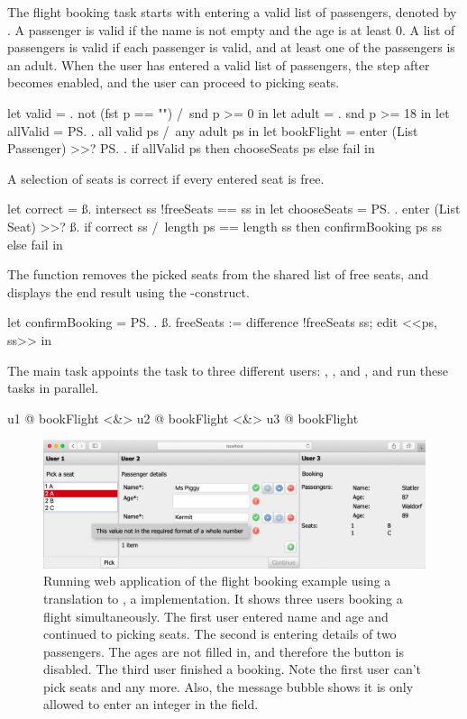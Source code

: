 The flight booking task starts with entering a valid list of passengers,
denoted by .
A passenger is valid if the name is not empty and the age is at least 0.
A list of passengers is valid if each passenger is valid, and at least one of the passengers is an adult.
When the user has entered a valid list of passengers, the step after  becomes enabled,
and the user can proceed to picking seats.
\begin{TASK}
  let valid = \p. not (fst p == "") /\ snd p >= 0 in
  let adult = \p. snd p >= 18 in
  let allValid = \ps. all valid ps /\ any adult ps in
  let bookFlight = enter (List Passenger) >>? \ps.
    if allValid ps then chooseSeats ps else fail in
\end{TASK}
A selection of seats is correct if every entered seat is free.
\begin{TASK}
  let correct = \ss. intersect ss !freeSeats == ss in
  let chooseSeats = \ps. enter (List Seat) >>? \ss.
    if correct ss /\ length ps == length ss
      then confirmBooking ps ss else fail in
\end{TASK}
The function  removes the picked seats from the shared list of free seats,
and displays the end result using the -construct.
\begin{TASK}
  let confirmBooking = \ps. \ss.
    freeSeats := difference !freeSeats ss; edit <<ps, ss>> in
\end{TASK}

The main task appoints the  task to three different users: , , and ,
and run these tasks in parallel.
\begin{TASK}
  u1 @ bookFlight <&> u2 @ bookFlight <&> u3 @ bookFlight
\end{TASK}

\begin{figure}[h]
  \includegraphics[width=\columnwidth]{figures/flight-booking.png}
  \caption{
    Running web application of the flight booking example using a translation to \ITASKS,
    a \TOP implementation.
    It shows three users booking a flight simultaneously.
    The first user entered name and age and continued to picking seats.
    The second is entering details of two passengers.
    The ages are not filled in, and therefore the  button is disabled.
    The third user finished a booking.
    Note the first user can't pick seats  and  any more.
    Also, the message bubble shows it is only allowed to enter an integer in the  field.
  }
  \label{fig:flight-booking}
\end{figure}
